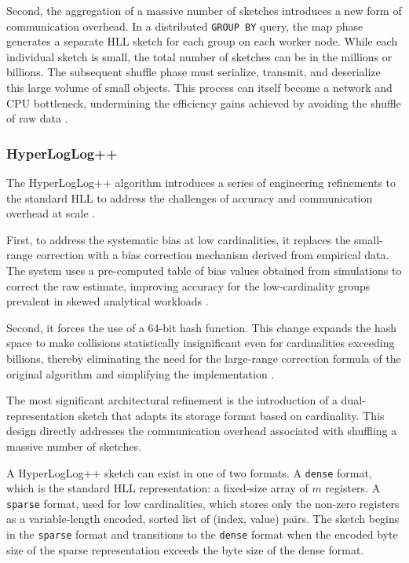 Second, the aggregation of a massive number of sketches introduces a new form of communication overhead. In a distributed \texttt{GROUP BY} query, the map phase generates a separate HLL sketch for each group on each worker node. While each individual sketch is small, the total number of sketches can be in the millions or billions. The subsequent shuffle phase must serialize, transmit, and deserialize this large volume of small objects. This process can itself become a network and CPU bottleneck, undermining the efficiency gains achieved by avoiding the shuffle of raw data \cite{Heule2013HyperLogLogIP}.
%

\subsubsection{HyperLogLog++}

The HyperLogLog++ algorithm introduces a series of engineering refinements to the standard HLL to address the challenges of accuracy and communication overhead at scale \cite{Heule2013HyperLogLogIP}.

First, to address the systematic bias at low cardinalities, it replaces the small-range correction with a bias correction mechanism derived from empirical data. The system uses a pre-computed table of bias values obtained from simulations to correct the raw estimate, improving accuracy for the low-cardinality groups prevalent in skewed analytical workloads \cite{Heule2013HyperLogLogIP}.

Second, it forces the use of a 64-bit hash function. This change expands the hash space to make collisions statistically insignificant even for cardinalities exceeding billions, thereby eliminating the need for the large-range correction formula of the original algorithm and simplifying the implementation \cite{Heule2013HyperLogLogIP}.

The most significant architectural refinement is the introduction of a dual-representation sketch that adapts its storage format based on cardinality. This design directly addresses the communication overhead associated with shuffling a massive number of sketches.

\begin{definition}
    A HyperLogLog++ sketch can exist in one of two formats. A \texttt{dense} format, which is the standard HLL representation: a fixed-size array of $m$ registers. A \texttt{sparse} format, used for low cardinalities, which stores only the non-zero registers as a variable-length encoded, sorted list of (index, value) pairs. The sketch begins in the \texttt{sparse} format and transitions to the \texttt{dense} format when the encoded byte size of the sparse representation exceeds the byte size of the dense format.
\end{definition}

